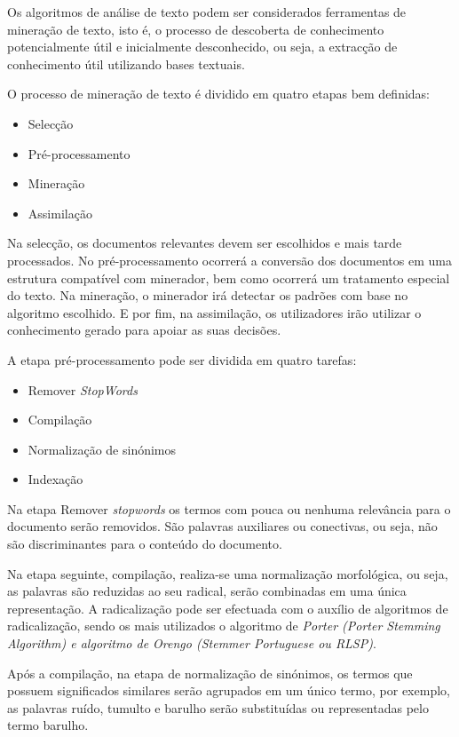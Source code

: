 Os algoritmos de análise de texto podem ser considerados ferramentas de mineração de texto, isto é, o processo de descoberta de conhecimento potencialmente útil e inicialmente desconhecido, ou seja, a extracção de conhecimento útil utilizando bases textuais.

O processo de mineração de texto é dividido em quatro etapas bem definidas:
\begin{itemize}
  \item Selecção
  \item Pré-processamento
  \item Mineração
  \item Assimilação
\end{itemize}

Na selecção, os documentos relevantes devem ser escolhidos e mais tarde processados.
No pré-processamento ocorrerá a conversão dos documentos em uma estrutura compatível com minerador, bem como ocorrerá um tratamento especial do texto.
Na mineração, o minerador irá detectar os padrões com base no algoritmo escolhido.
E por fim, na assimilação, os utilizadores irão utilizar o conhecimento gerado para apoiar as suas decisões.

A etapa pré-processamento pode ser dividida em quatro tarefas:
\begin{itemize}
  \item Remover \textit{StopWords}
  \item Compilação
  \item Normalização de sinónimos
  \item Indexação
\end{itemize}

Na etapa Remover \textit{stopwords} os termos com pouca ou nenhuma relevância para o documento serão removidos.
São palavras auxiliares ou conectivas, ou seja, não são discriminantes para o conteúdo do documento.

Na etapa seguinte, compilação, realiza-se uma normalização morfológica, ou seja, as palavras são reduzidas ao seu radical, serão combinadas em uma única representação. A radicalização pode ser efectuada com o auxílio de algoritmos de radicalização, sendo os mais utilizados o algoritmo de \textit{Porter (Porter Stemming Algorithm) e algoritmo de Orengo (Stemmer Portuguese ou RLSP)}.

Após a compilação, na etapa de normalização de sinónimos, os termos que possuem significados similares serão agrupados em um único termo, por exemplo, as palavras ruído, tumulto e barulho serão substituídas ou representadas pelo termo barulho.

